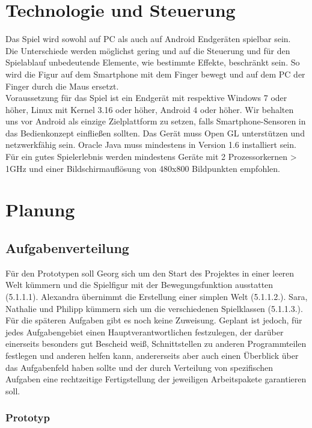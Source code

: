 \documentclass[10pt,a4paper,notitlepage]{report}
\begin{document}
\begin{flushleft}
\begin{center}
	\end{center}
\chapter{Technologie und Steuerung}
Das Spiel wird sowohl auf PC als auch auf Android Endgeräten spielbar sein.\\
Die Unterschiede werden möglichst gering und auf die Steuerung und für den Spielablauf unbedeutende Elemente, wie bestimmte Effekte, beschränkt sein. So wird die Figur auf dem Smartphone mit dem Finger bewegt und auf dem PC der Finger durch die Maus ersetzt.\\
Voraussetzung für das Spiel ist ein Endgerät mit respektive Windows 7 oder höher, Linux mit Kernel 3.16 oder höher, Android 4 oder höher. Wir behalten uns vor Android als einzige Zielplattform zu setzen, falls Smartphone-Sensoren in das Bedienkonzept einfließen sollten. Das Gerät muss Open GL unterstützen und netzwerkfähig sein. Oracle Java muss mindestens in Version 1.6 installiert sein. Für ein gutes Spielerlebnis werden mindestens Geräte mit 2 Prozessorkernen > 1GHz und einer Bildschirmauflösung von 480x800 Bildpunkten empfohlen.

\chapter{Planung}
\section{Aufgabenverteilung}
Für den Prototypen soll Georg sich um den Start des Projektes in einer leeren Welt kümmern und die Spielfigur mit der Bewegungsfunktion ausstatten (5.1.1.1). Alexandra übernimmt die Erstellung einer simplen Welt (5.1.1.2.). Sara, Nathalie und Philipp kümmern sich um die verschiedenen Spielklassen (5.1.1.3.).\\
Für die späteren Aufgaben gibt es noch keine Zuweisung. Geplant ist jedoch, für jedes Aufgabengebiet einen Hauptverantwortlichen festzulegen, der darüber einerseits besonders gut Bescheid weiß, Schnittstellen zu anderen Programmteilen festlegen und anderen helfen kann, andererseits aber auch einen Überblick über das Aufgabenfeld haben sollte und der durch Verteilung von spezifischen Aufgaben eine rechtzeitige Fertigstellung der jeweiligen Arbeitspakete garantieren soll.\\
\subsection{Prototyp}


\end{flushleft}
\end{document}
